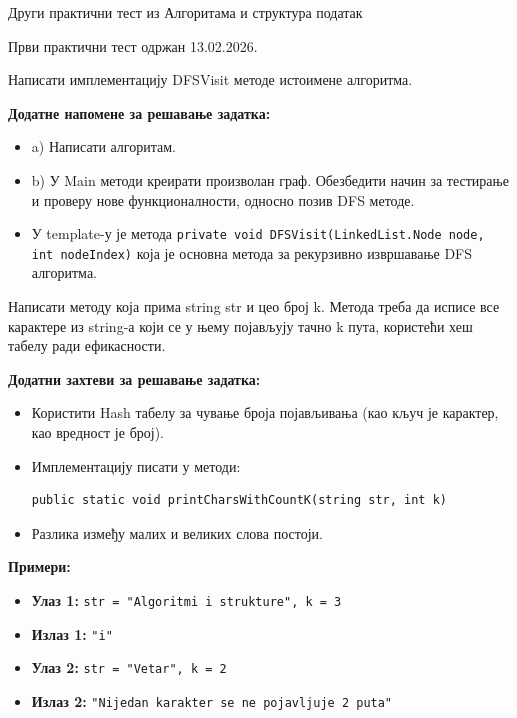 
Други практични тест из Алгоритама и структура податак

Први практични тест одржан 13.02.2026.

Написати имплементацију DFSVisit методе истоимене алгоритма.

\textbf{Додатне напомене за решавање задатка:}
\begin{itemize}
	\item a) Написати алгоритам.
	\item b) У Main методи креирати произволан граф. Обезбедити начин за тестирање и проверу нове функционалности, односно позив DFS методе.
	\item У template-у је метода \texttt{private void DFSVisit(LinkedList.Node node, int nodeIndex)} која је основна метода за рекурзивно извршавање DFS алгоритма.
\end{itemize}

Написати методу која прима string str и цео број k. Метода треба да исписе все карактере из string-а који се у њему појављују тачно k пута, користећи хеш табелу ради ефикасности.

\textbf{Додатни захтеви за решавање задатка:}
\begin{itemize}
	\item Користити Hash табелу за чување броја појављивања (као кључ је карактер, као вредност је број).
	\item Имплементацију писати у методи:
	\begin{Verbatim}[fontsize=\small]
public static void printCharsWithCountK(string str, int k)
	\end{Verbatim}
	\item Разлика између малих и великих слова постоји.
\end{itemize}

\textbf{Примери:}
\begin{itemize}
	\item \textbf{Улаз 1:} \texttt{str = "Algoritmi i strukture", k = 3}
	\item \textbf{Излаз 1:} \texttt{"i"}
	\item \textbf{Улаз 2:} \texttt{str = "Vetar", k = 2}
	\item \textbf{Излаз 2:} \texttt{"Nijedan karakter se ne pojavljuje 2 puta"}
\end{itemize}

